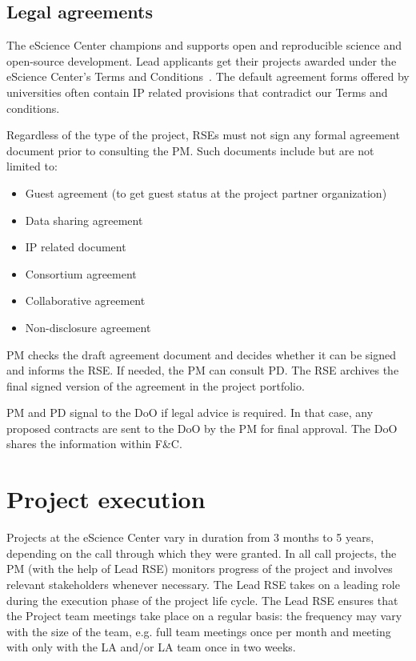 \documentclass[11pt]{article}
\begin{document}
\subsection{Legal agreements}
\label{sec:init:legal}
The eScience Center champions and supports open and reproducible science and open-source development. Lead applicants
get their projects awarded under the eScience Center's Terms and Conditions~\cite{nlesc-terms}. The default agreement forms offered by universities often contain IP related provisions that contradict
our Terms and conditions.

Regardless of the type of the project, RSEs must not sign any formal agreement document prior to consulting the PM. Such
documents include but are not limited to:
\begin{itemize}
\item Guest agreement (to get guest status at the project partner organization)
\item Data sharing agreement
\item IP related document
\item Consortium agreement
\item Collaborative agreement
\item Non-disclosure agreement
\end{itemize}

PM checks the draft agreement document and decides whether it can be signed and informs the RSE. If needed, the PM can
consult PD. The RSE archives the final signed version of the agreement in the project portfolio.

PM and PD signal to the DoO if legal advice is required. In that case, any proposed contracts are sent to the DoO by the
PM for final approval. The DoO shares the information within F\&C.

\clearpage
\section{Project execution}
Projects at the eScience Center vary in duration from 3 months to 5 years, depending on the call through which they were
granted. In all call projects, the PM (with the help of Lead RSE) monitors progress of the project and involves
relevant stakeholders whenever necessary. The Lead RSE takes on a leading role during the execution phase of the
project life cycle. The Lead RSE ensures that the Project team meetings take place on a regular basis: the frequency
may vary with the size of the team, e.g. full team meetings once per month and meeting with only with the LA and/or LA
team once in two weeks.
\end{document}
